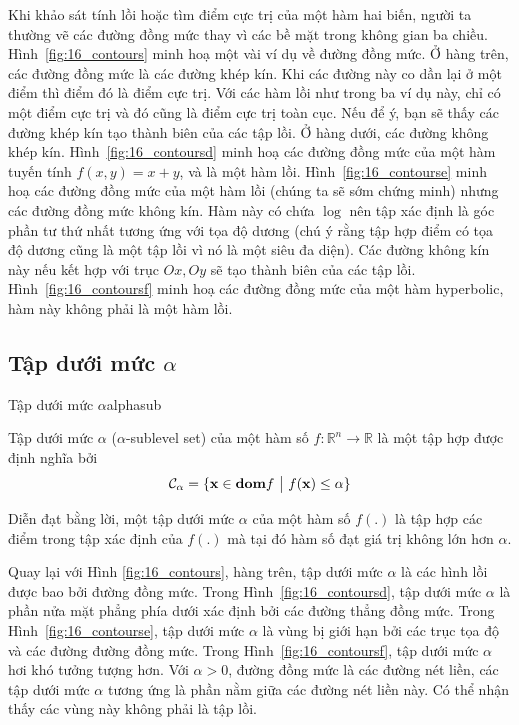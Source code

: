 Khi khảo sát tính lồi hoặc tìm điểm cực trị của một hàm hai biến,
người ta thường vẽ các đường đồng mức thay vì các bề mặt trong không gian ba chiều.
Hình~\ref{fig:16_contours} minh hoạ một vài ví dụ về đường đồng mức. Ở hàng trên,
các đường đồng mức là các đường khép kín. Khi các đường này co dần lại ở một điểm thì điểm đó là điểm cực trị. Với các hàm
lồi như trong ba ví dụ này, chỉ có một điểm cực trị và đó cũng là điểm cực trị toàn cục. Nếu để ý, bạn sẽ thấy các
đường khép kín tạo thành biên của các {tập lồi}. Ở hàng dưới, các đường
không khép kín. Hình~\ref{fig:16_contoursd} minh hoạ các đường đồng mức của một
hàm tuyến tính $f(x, y) = x + y$, và là một hàm lồi.
Hình~\ref{fig:16_contourse} minh hoạ các đường đồng mức của một hàm lồi (chúng
ta sẽ sớm chứng minh) nhưng các đường đồng mức không kín.
Hàm này có chứa $\log$ nên tập xác định là góc phần tư thứ nhất tương ứng với tọa độ dương (chú ý rằng tập hợp điểm có tọa độ dương cũng là một
{tập lồi} vì nó là một siêu đa diện). Các {đường không kín} này nếu
kết hợp với trục $Ox, Oy$ sẽ tạo thành biên của các {tập lồi}.
Hình~\ref{fig:16_contoursf} minh hoạ các đường đồng mức của một hàm hyperbolic, hàm
này không phải là một hàm lồi.

\subsection{Tập dưới mức $\alpha$}

\begin{mydef}{Tập dưới mức $\alpha$}{alphasub}

Tập dưới mức $\alpha$ ($\alpha$-sublevel set) của một hàm số $f : \mathbb{R}^n \rightarrow
\mathbb{R}$ là một tập hợp được định nghĩa bởi
\begin{equation*}
\mathcal{C}_{\alpha} = \{\mathbf{x} \in \text{\bf dom} f ~\big|~ f(\mathbf{x}) \leq \alpha\}
\end{equation*}
\end{mydef}
Diễn đạt bằng lời, một tập dưới mức $\alpha$ của một hàm số $f(.)$ là tập hợp các
điểm trong tập xác định của $f(.)$ mà tại đó hàm số đạt giá trị không lớn hơn
$\alpha$.


Quay lại với Hình \ref{fig:16_contours}, hàng trên, tập dưới mức $\alpha$ là các hình lồi được bao bởi đường đồng mức. Trong Hình~\ref{fig:16_contoursd}, tập dưới mức $\alpha$ là phần nửa mặt phẳng phía dưới xác định bởi
các đường thẳng đồng mức. Trong Hình~\ref{fig:16_contourse}, tập dưới mức $\alpha$ là vùng bị giới hạn bởi các trục tọa độ và các đường đường đồng mức. Trong
Hình~\ref{fig:16_contoursf}, tập dưới mức $\alpha$ hơi khó tưởng tượng hơn. Với $\alpha > 0$, đường đồng mức là các đường nét liền, các tập dưới mức
$\alpha$ tương ứng là phần nằm giữa các đường nét liền này. Có thể
nhận thấy các vùng này không phải là tập lồi.


